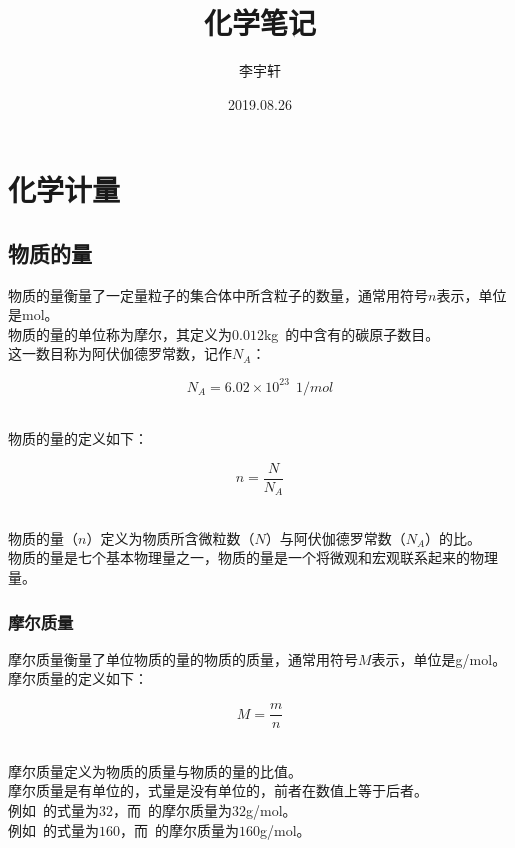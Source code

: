 \documentclass[UTF8]{ctexart}
\title{化学笔记}
\author{李宇轩}
\date{2019.08.26}
\begin{document}
\maketitle

\newpage

\tableofcontents

\newpage

\setlength{\parindent}{0pt}

\section{化学计量}

\subsection{物质的量}
    物质的量衡量了一定量粒子的集合体中所含粒子的数量，通常用符号$n$表示，单位是\si{mol}。\\[3mm]
    物质的量的单位称为摩尔，其定义为$0.012$\si{kg}~的中含有的碳原子数目。\\[3mm]
    这一数目称为阿伏伽德罗常数，记作$N_A$：
    \begin{large}
        \begin{equation*}
            N_A=6.02\times 10^{23}~~\si{1/mol}
        \end{equation*}
    \end{large}\\
    物质的量的定义如下：
    \begin{large}
        \begin{equation*}
            n=\frac{N}{N_A}
        \end{equation*}
    \end{large}\\
    物质的量（$n$）定义为物质所含微粒数（$N$）与阿伏伽德罗常数（$N_A$）的比。\\[3mm]
    物质的量是七个基本物理量之一，物质的量是一个将微观和宏观联系起来的物理量。

\subsubsection{摩尔质量}
    摩尔质量衡量了单位物质的量的物质的质量，通常用符号$M$表示，单位是\si{g/mol}。\\[3mm]
    摩尔质量的定义如下：
    \begin{large}
        \begin{equation*}
            M=\frac{m}{n}
        \end{equation*}
    \end{large}\\
    摩尔质量定义为物质的质量与物质的量的比值。\\[3mm]
    摩尔质量是有单位的，式量是没有单位的，前者在数值上等于后者。\\[3mm]
    例如~的式量为$32$，而~的摩尔质量为$32$\si{g/mol}。\\[3mm]
    例如~的式量为$160$，而~的摩尔质量为$160$\si{g/mol}。
\end{document}
